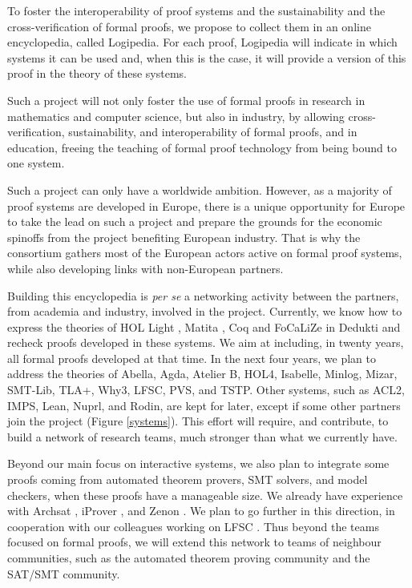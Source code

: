 To foster the interoperability of proof systems and the sustainability
and the cross-verification of formal proofs, we propose to collect
them in an online encyclopedia, called {\sf Logipedia}.  For each
proof, {\sf Logipedia} will indicate in which systems it can be used
and, when this is the case, it will provide a version of this proof in
the theory of these systems.

Such a project will not only foster the use of formal proofs in
research in mathematics and computer science, but also in industry, by
allowing cross-verification, sustainability, and interoperability of
formal proofs, and in education, freeing the teaching of formal proof
technology from being bound to one system.

Such a project can only have a worldwide ambition. However, as a
majority of proof systems are developed in Europe, there is a unique
opportunity for Europe to take the lead on such a project and prepare
the grounds for the economic spinoffs from the project benefiting
European industry. That is why the consortium gathers most of the
European actors active on formal proof systems, while also developing
links with non-European partners.

Building this encyclopedia is {\em per se} a networking activity
between the partners, from academia and industry, involved in the
project.  Currently, we know how to express the theories of {\sf HOL
  Light} \cite{Assaf12}, {\sf Matita} \cite{Assaf15}, {\sf Coq} and
{\sf FoCaLiZe} \cite{Cauderlier16} in {\sf Dedukti} and recheck proofs
developed in these systems.  We aim at including, in twenty years, all
formal proofs developed at that time.
In the next four years, we plan to address the theories of {\sf
  Abella}, {\sf Agda}, {\sf Atelier B}, {\sf HOL4}, {\sf Isabelle},
{\sf Minlog}, {\sf Mizar}, {\sf SMT-Lib}, {\sf TLA+}, {\sf Why3}, {\sf
  LFSC}, {\sf PVS}, and {\sf TSTP}.  Other systems, such as {\sf
  ACL2}, {\sf IMPS}, {\sf Lean}, {\sf Nuprl}, and {\sf Rodin}, are
kept for later, except if some other partners join the project (Figure
\ref{systems}). This effort will require, and contribute, to build a
network of research teams, much stronger than what we currently have.

Beyond our main focus on interactive systems, we also plan to
integrate some proofs coming from automated theorem provers, SMT
solvers, and model checkers, when these proofs have a manageable
size. We already have experience with Archsat \cite{Bury19}, iProver
\cite{Burel10}, and Zenon \cite{CauderlierHalmagrand15}. We plan to go
further in this direction, in cooperation with our colleagues working
on LFSC \cite{Stump09}. Thus beyond the teams focused on formal proofs, we
will extend this network to teams of neighbour communities, such as
the automated theorem proving community and the SAT/SMT community.

